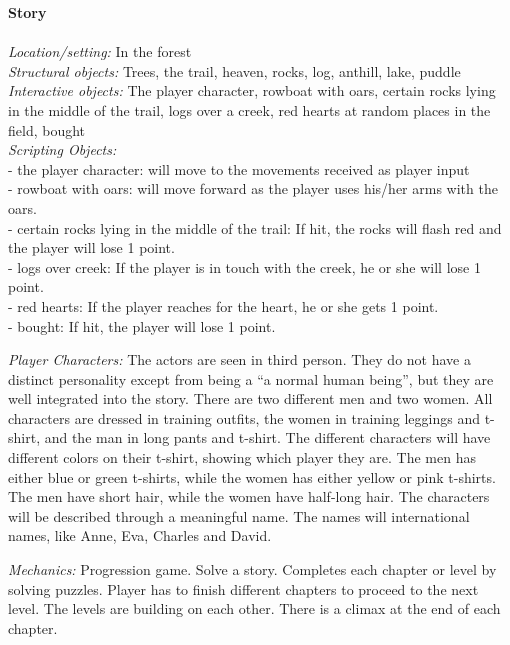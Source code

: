 \textbf{Story} \\ \\
\emph{Location/setting:} In the forest \\
\emph{Structural objects:} Trees, the trail, heaven, rocks, log, anthill, lake, puddle \\
\emph{Interactive objects:} The player character, rowboat with oars, certain rocks lying in the middle of the trail, logs over a creek, red hearts at random places in the field, bought \\
\emph{Scripting Objects:} \\
- the player character: will move to the movements received as player input\\
- rowboat with oars: will move forward as the player uses his/her arms with the oars. \\
- certain rocks lying in the middle of the trail: If hit, the rocks will flash red and the player will lose 1 point. \\
- logs over creek: If the player is in touch with the creek, he or she will lose 1 point. \\
- red hearts: If the player reaches for the heart, he or she gets 1 point. \\
- bought: If hit, the player will lose 1 point.

\emph{Player Characters:} The actors are seen in third person. They do not have a distinct personality except from being a “a normal human being”, but they are well integrated into the story. There are two different men and two women. All characters are dressed in training outfits, the women in training leggings and t-shirt, and the man in long pants and t-shirt. The different characters will have different colors on their t-shirt, showing which player they are. The men has either blue or green t-shirts, while the women has either yellow or pink t-shirts. The men have short hair, while the women have half-long hair. The characters will be described through a meaningful name. The names will international names, like Anne, Eva, Charles and David. 

\emph{Mechanics:} Progression game. Solve a story. Completes each chapter or level by solving puzzles. Player has to finish different chapters to proceed to the next level. The levels are building on each other. There is a climax at the end of each chapter. 

